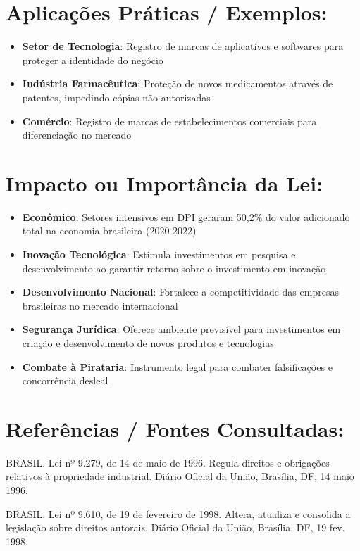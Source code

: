 \documentclass[12pt, a4paper]{article}
\begin{document}
\section{Aplicações Práticas / Exemplos:}
\begin{itemize}
    \item \textbf{Setor de Tecnologia}: Registro de marcas de aplicativos e softwares para proteger a identidade do negócio
    \item \textbf{Indústria Farmacêutica}: Proteção de novos medicamentos através de patentes, impedindo cópias não autorizadas
    \item \textbf{Comércio}: Registro de marcas de estabelecimentos comerciais para diferenciação no mercado
\end{itemize}

\section{Impacto ou Importância da Lei:}
\begin{itemize}
    \item \textbf{Econômico}: Setores intensivos em DPI geraram 50,2\% do valor adicionado total na economia brasileira (2020-2022)
    \item \textbf{Inovação Tecnológica}: Estimula investimentos em pesquisa e desenvolvimento ao garantir retorno sobre o investimento em inovação
    \item \textbf{Desenvolvimento Nacional}: Fortalece a competitividade das empresas brasileiras no mercado internacional
    \item \textbf{Segurança Jurídica}: Oferece ambiente previsível para investimentos em criação e desenvolvimento de novos produtos e tecnologias
    \item \textbf{Combate à Pirataria}: Instrumento legal para combater falsificações e concorrência desleal
\end{itemize}

\section{Referências / Fontes Consultadas:}

BRASIL. Lei nº 9.279, de 14 de maio de 1996. Regula direitos e obrigações relativos à propriedade industrial. Diário Oficial da União, Brasília, DF, 14 maio 1996.

BRASIL. Lei nº 9.610, de 19 de fevereiro de 1998. Altera, atualiza e consolida a legislação sobre direitos autorais. Diário Oficial da União, Brasília, DF, 19 fev. 1998.
\end{document}
